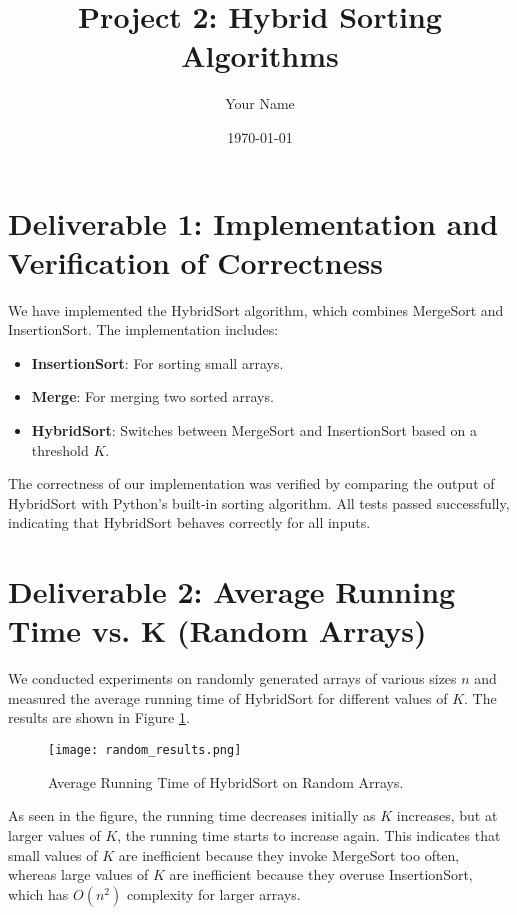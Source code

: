 \documentclass{article}
\title{Project 2: Hybrid Sorting Algorithms}
\author{Your Name}
\date{\today}
\begin{document}
	
	\maketitle
	
	\section*{Deliverable 1: Implementation and Verification of Correctness}
	
	We have implemented the HybridSort algorithm, which combines MergeSort and InsertionSort. The implementation includes:
	
	\begin{itemize}
		\item \textbf{InsertionSort}: For sorting small arrays.
		\item \textbf{Merge}: For merging two sorted arrays.
		\item \textbf{HybridSort}: Switches between MergeSort and InsertionSort based on a threshold \( K \).
	\end{itemize}
	
	The correctness of our implementation was verified by comparing the output of HybridSort with Python's built-in sorting algorithm. All tests passed successfully, indicating that HybridSort behaves correctly for all inputs.
	
	\section*{Deliverable 2: Average Running Time vs. K (Random Arrays)}
	
	We conducted experiments on randomly generated arrays of various sizes \( n \) and measured the average running time of HybridSort for different values of \( K \). The results are shown in Figure \ref{fig:random}.
	
	\begin{figure}[h]
		\centering
		\texttt{[image: random\_results.png]}
		\caption{Average Running Time of HybridSort on Random Arrays.}
		\label{fig:random}
	\end{figure}
	
	As seen in the figure, the running time decreases initially as \( K \) increases, but at larger values of \( K \), the running time starts to increase again. This indicates that small values of \( K \) are inefficient because they invoke MergeSort too often, whereas large values of \( K \) are inefficient because they overuse InsertionSort, which has \( O(n^2) \) complexity for larger arrays.
	
\end{document}
